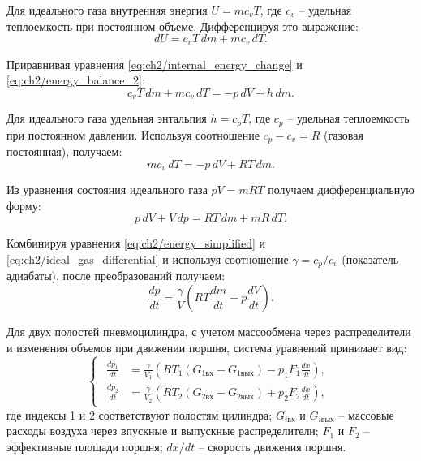 Для идеального газа внутренняя энергия $U = mc_vT$,
где $c_v$ -- удельная теплоемкость при постоянном объеме. Дифференцируя это выражение:
\begin{equation}
	\label{eq:ch2/energy_balance_2}
	dU = c_vT\,dm + mc_v\,dT.
\end{equation}

Приравнивая уравнения \eqref{eq:ch2/internal_energy_change} и \eqref{eq:ch2/energy_balance_2}:
\begin{equation}
	\label{eq:ch2/energy_equality}
	c_vT\,dm + mc_v\,dT = -p\,dV + h\,dm.
\end{equation}

Для идеального газа удельная энтальпия $h = c_pT$,
где $c_p$ -- удельная теплоемкость при постоянном давлении.
Используя соотношение $c_p - c_v = R$ (газовая постоянная), получаем:
\begin{equation}
	\label{eq:ch2/energy_simplified}
	mc_v\,dT = -p\,dV + RT\,dm.
\end{equation}

Из уравнения состояния идеального газа $pV = mRT$ получаем дифференциальную форму:
\begin{equation}
	\label{eq:ch2/ideal_gas_differential}
	p\,dV + V\,dp = RT\,dm + mR\,dT.
\end{equation}

Комбинируя уравнения \eqref{eq:ch2/energy_simplified} и \eqref{eq:ch2/ideal_gas_differential} и
используя соотношение $\gamma = c_p/c_v$ (показатель адиабаты), после преобразований получаем:
\begin{equation}
	\label{eq:ch2/pressure_change}
	\frac{dp}{dt} = \frac{\gamma}{V}\left(RT\frac{dm}{dt} - p\frac{dV}{dt}\right).
\end{equation}

Для двух полостей пневмоцилиндра, с учетом массообмена через распределители и
изменения объемов при движении поршня, система уравнений принимает вид:
\begin{equation}
	\label{eq:ch2/final_pressure_system}
	\begin{cases}
		\begin{aligned}
			\frac{dp_1}{dt} & = \frac{\gamma}{V_1}\left(RT_1(G_{1\text{вх}} - G_{1\text{вых}}) - p_1F_1\frac{dx}{dt}\right), \\
			\frac{dp_2}{dt} & = \frac{\gamma}{V_2}\left(RT_2(G_{2\text{вх}} - G_{2\text{вых}}) + p_2F_2\frac{dx}{dt}\right),
		\end{aligned}
	\end{cases}
\end{equation}
где индексы 1 и 2 соответствуют полостям цилиндра;
$G_{i\text{вх}}$ и $G_{i\text{вых}}$ -- массовые расходы воздуха
через впускные и выпускные распределители;
$F_1$ и $F_2$ -- эффективные площади поршня;
$dx/dt$ -- скорость движения поршня.

